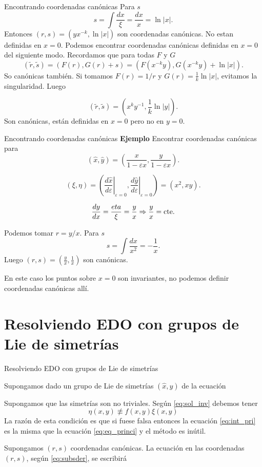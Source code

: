 \documentclass[handout,hyperref={colorlinks=true}]{beamer}
\renewcommand{\epsilon}{\varepsilon}
\begin{document}
\begin{frame}{Encontrando coordenadas canónicas}\label{pag_ejem_canon2}
 Para $s$
\[s=\int\frac{dx}{\xi}=\frac{dx}{x}=\ln|x|.\]
Entonces $(r,s)=(yx^{-k},\ln|x|)$ son coordenadas canónicas. No estan definidas en $x=0$.
Podemos encontrar coordenadas canónicas definidas en $x=0$ del siguiente modo. Recordamos que para todas $F$ y $G$
\[(\tilde{r},\tilde{s})=(F(r),G(r)+s)=(F(x^{-k}y),G(x^{-k}y)+\ln|x|).\]
So canónicas también. Si tomamos $F(r)=1/r$ y $G(r)=\frac{1}{k}\ln|x|$, evitamos la singularidad. Luego

\[(\tilde{r},\tilde{s})=(x^ky^{-1},\frac{1}{k}\ln|y|).\]
Son canónicas, están definidas en $x=0$ pero no en $y=0$.  






\end{frame}


\begin{frame}{Encontrando coordenadas canónicas}\label{pag:can_ejem_p}
\textbf{Ejemplo} Encontrar coordenadas canónicas para
\[(\hat{x},\hat{y})=\left( \frac{x}{1-\epsilon x},\frac{y}{1-\epsilon x}\right).\]

\[(\xi,\eta)=\left(\left.\frac{d\hat{x}}{d\epsilon}\right|_{\epsilon=0},\left.\frac{d\hat{y}}{d\epsilon}\right|_{\epsilon=0}\right)=(x^2,xy).\]

\[\frac{dy}{dx}=\frac{eta}{\xi}=\frac{y}{x}\Rightarrow \frac{y}{x}=\hbox{cte}.\]

Podemos tomar $r=y/x$. Para $s$
\[s=\int\frac{dx}{x^2}=-\frac{1}{x}.\]
Luego $(r,s)=(\frac{y}{x},\frac{1}{x})$ son canónicas.



En este caso los puntos sobre $x=0$ son invariantes, no podemos definir coordenadas canónicas allí.


 
\end{frame}

\section[Resolviendo EDO]{Resolviendo EDO con grupos de Lie de simetrías}

\begin{frame}{Resolviendo EDO con grupos de Lie de simetrías}

\onslide<+-> Supongamos dado  un grupo de Lie de simetrías $(\hat{x},\hat{y})$ de la ecuación

\onslide<+-> Supongamos  que las simetrías son no triviales. Según \eqref{eq:sol_inv} debemos tener
 \[\eta(x,y)\not\equiv f(x,y)\xi(x,y)\]
La razón de esta condición es que si fuese falsa entonces la ecuación \eqref{eq:int_pri} es la misma que la ecuación \eqref{eq:eq_princi} y el método es inútil.

\onslide<+->Supongamos $(r,s)$ coordenadas canónicas. La ecuación en las coordenadas $(r,s)$, según \eqref{eq:subsder}, se escribirá
 
\end{frame}
\end{document}
